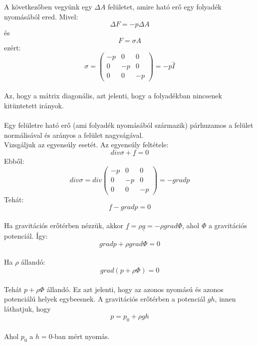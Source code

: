 \documentclass[a4paper]{article}
\begin{document}
A következőben vegyünk egy $\Delta A$ felületet, amire ható erő egy folyadék nyomásából ered. Mivel:
\begin{equation}
\Delta F=-p\Delta A
\end{equation}
és
\begin{equation}
F=\sigma A
\end{equation}
ezért:
\begin{equation}
\sigma=\begin{pmatrix}
    -p & 0 & 0 \\
    0 & -p & 0 \\
    0 & 0 & -p
\end{pmatrix}=-p\hat{I}
\end{equation}
\\
Az, hogy a mátrix diagonális, azt jelenti, hogy a folyadékban nincsenek kitüntetett irányok. 
\\
\\
Egy felületre ható erő (ami folyadék nyomásából származik) párhuzamos a felület normálisával és arányos a felület nagyságával.
\\
Vizsgáljuk az egyensúly esetét. Az egyensúly feltétele:
\begin{equation}
div\sigma+\underline{f}=0
\end{equation}
Ebből:
\begin{equation}
div\sigma=div\begin{pmatrix}
    -p & 0 & 0 \\
    0 & -p & 0 \\
    0 & 0 & -p
\end{pmatrix}=-gradp
\end{equation}
Tehát:
\begin{equation}
\underline{f}-gradp=0
\end{equation}
\\
Ha gravitációs erőtérben nézzük, akkor $\underline{f}=\rho\underline{g}=-\rho grad\Phi$, ahol $\Phi$ a gravitációs potenciál. Így:
\begin{equation}
gradp+\rho grad\Phi=0
\end{equation}
\\
Ha $\rho$ állandó:
\begin{equation}
grad(p+\rho\Phi)=0
\end{equation}
\\
Tehát $p+\rho\Phi$ állandó. Ez azt jelenti, hogy az azonos nyomású és azonos potenciálú helyek egybeesnek. A gravitációs erőtérben a potenciál $gh$, innen láthatjuk, hogy
\begin{equation}
p=p_{0}+\rho gh
\end{equation}
\\
Ahol $p_{0}$ a $h=0$-ban mért nyomás.
\\
\\
\end{document}
